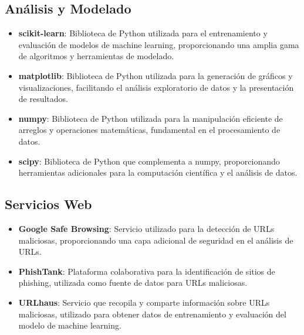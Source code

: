\subsection*{Análisis y Modelado}
\begin{itemize}
    \item \textbf{scikit-learn}: Biblioteca de Python utilizada para el entrenamiento y evaluación de modelos de machine learning, proporcionando una amplia gama de algoritmos y herramientas de modelado.
    \item \textbf{matplotlib}: Biblioteca de Python utilizada para la generación de gráficos y visualizaciones, facilitando el análisis exploratorio de datos y la presentación de resultados.
    \item \textbf{numpy}: Biblioteca de Python utilizada para la manipulación eficiente de arreglos y operaciones matemáticas, fundamental en el procesamiento de datos.
    \item \textbf{scipy}: Biblioteca de Python que complementa a numpy, proporcionando herramientas adicionales para la computación científica y el análisis de datos.
\end{itemize}

\subsection*{Servicios Web}
\begin{itemize}
    \item \textbf{Google Safe Browsing}: Servicio utilizado para la detección de URLs maliciosas, proporcionando una capa adicional de seguridad en el análisis de URLs.
    \item \textbf{PhishTank}: Plataforma colaborativa para la identificación de sitios de phishing, utilizada como fuente de datos para URLs maliciosas.
    \item \textbf{URLhaus}: Servicio que recopila y comparte información sobre URLs maliciosas, utilizado para obtener datos de entrenamiento y evaluación del modelo de machine learning.
\end{itemize}